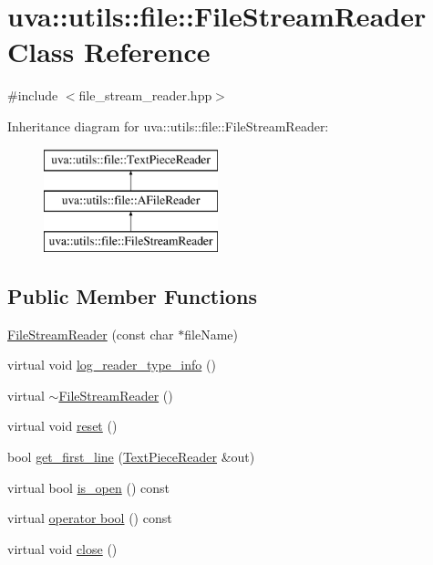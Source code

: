 \hypertarget{classuva_1_1utils_1_1file_1_1_file_stream_reader}{}\section{uva\+:\+:utils\+:\+:file\+:\+:File\+Stream\+Reader Class Reference}
\label{classuva_1_1utils_1_1file_1_1_file_stream_reader}


{\ttfamily \#include $<$file\+\_\+stream\+\_\+reader.\+hpp$>$}

Inheritance diagram for uva\+:\+:utils\+:\+:file\+:\+:File\+Stream\+Reader\+:\begin{figure}[H]
\begin{center}
\leavevmode
\includegraphics[height=3.000000cm]{classuva_1_1utils_1_1file_1_1_file_stream_reader}
\end{center}
\end{figure}
\subsection*{Public Member Functions}
\begin{DoxyCompactItemize}
\item 
\hyperlink{classuva_1_1utils_1_1file_1_1_file_stream_reader_abdb16489065b3ae764affd009b2825a9}{File\+Stream\+Reader} (const char $\ast$file\+Name)
\item 
virtual void \hyperlink{classuva_1_1utils_1_1file_1_1_file_stream_reader_ae79cbf1fdb22e6c49bc8bbfcd37293e4}{log\+\_\+reader\+\_\+type\+\_\+info} ()
\item 
virtual \hyperlink{classuva_1_1utils_1_1file_1_1_file_stream_reader_a2321bb4d57ffd010c3a0c8caa4b4ca36}{$\sim$\+File\+Stream\+Reader} ()
\item 
virtual void \hyperlink{classuva_1_1utils_1_1file_1_1_file_stream_reader_a4aebc34e09650f5d203766316f150c26}{reset} ()
\item 
bool \hyperlink{classuva_1_1utils_1_1file_1_1_file_stream_reader_a85318d451b8d37c0905be75bba1e177c}{get\+\_\+first\+\_\+line} (\hyperlink{classuva_1_1utils_1_1file_1_1_text_piece_reader}{Text\+Piece\+Reader} \&out)
\item 
virtual bool \hyperlink{classuva_1_1utils_1_1file_1_1_file_stream_reader_ab952c160f5acb1da50d56c48c6ed6cf5}{is\+\_\+open} () const 
\item 
virtual \hyperlink{classuva_1_1utils_1_1file_1_1_file_stream_reader_a9c957ed20c12db54358aa54ddca2f68a}{operator bool} () const 
\item 
virtual void \hyperlink{classuva_1_1utils_1_1file_1_1_file_stream_reader_acbfee665ec3f165921b9a4a0d3797ff5}{close} ()
\end{DoxyCompactItemize}
